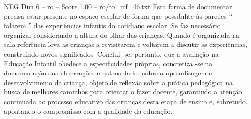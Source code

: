 \begin{textsample}{NEG Dim 6 – ro – Score 1.00 – ro/ro\_inf\_46.txt}
Esta forma de documentar precisa estar presente no espaço escolar de forma que possibilite às paredes “ falarem ” das experiências infantis do cotidiano escolar.
Se faz necessário organizar considerando a altura do olhar das crianças.
Quando é organizada na sala referência leva as crianças a revisitarem e voltarem a discutir as experiências, construindo novos significados.
Conclui -se, portanto, que a avaliação na Educação Infantil obedece a especificidades próprias, concretiza -se na documentação das observações e outros dados sobre a aprendizagem e desenvolvimento da criança, objeto de reflexão sobre a prática pedagógica na busca de melhores caminhos para orientar o fazer docente, garantindo a atenção continuada ao processo educativo das crianças desta etapa de ensino e, sobretudo, apontando o compromisso com a qualidade da educação.

\end{textsample}
